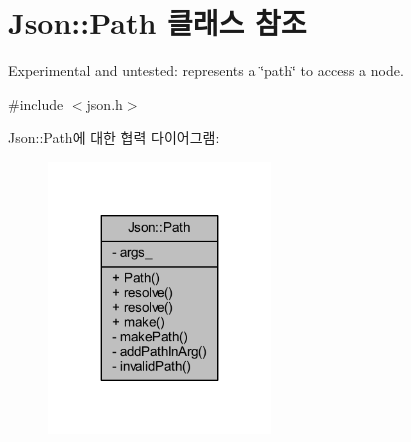 \hypertarget{class_json_1_1_path}{}\section{Json\+:\+:Path 클래스 참조}
\label{class_json_1_1_path}


Experimental and untested\+: represents a \char`\"{}path\char`\"{} to access a node.  




{\ttfamily \#include $<$json.\+h$>$}



Json\+:\+:Path에 대한 협력 다이어그램\+:\nopagebreak
\begin{figure}[H]
\begin{center}
\leavevmode
\includegraphics[width=167pt]{class_json_1_1_path__coll__graph}
\end{center}
\end{figure}
